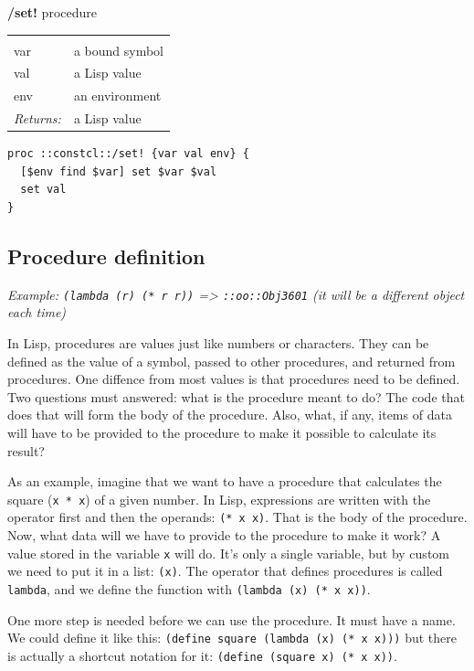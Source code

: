\documentclass[twoside,9pt]{report}
\begin{document}
\textbf{/set!} procedure

\noindent\begin{tabular}{ |p{1.5cm} p{8cm}| }
\hline
\rowcolor[HTML]{CCCCCC} \multicolumn{2}{|l|}{\bf /set! (internal)} \\
var & a bound symbol \\
val & a Lisp value \\
env & an environment \\
\textit{Returns:} & a Lisp value \\
\hline
\end{tabular}
\begin{lstlisting}
proc ::constcl::/set! {var val env} {
  [$env find $var] set $var $val
  set val
}
\end{lstlisting}
\subsection{Procedure definition}
\label{procedure-definition}


\emph{Example: \texttt{(lambda (r) (* r r))} => \texttt{::oo::Obj3601} (it will be a different object each time)}


In Lisp, procedures are values just like numbers or characters. They can be defined as the value of a symbol, passed to other procedures, and returned from procedures. One diffence from most values is that procedures need to be defined. Two questions must answered: what is the procedure meant to do? The code that does that will form the body of the procedure. Also, what, if any, items of data will have to be provided to the procedure to make it possible to calculate its result?


As an example, imagine that we want to have a procedure that calculates the square (\texttt{x * x}) of a given number. In Lisp, expressions are written with the operator first and then the operands: \texttt{(* x x)}. That is the body of the procedure. Now, what data will we have to provide to the procedure to make it work? A value stored in the variable \texttt{x} will do. It's only a single variable, but by custom we need to put it in a list: \texttt{(x)}. The operator that defines procedures is called \texttt{lambda}, and we define the function with \texttt{(lambda (x) (* x x))}.


One more step is needed before we can use the procedure. It must have a name. We could define it like this: \texttt{(define square (lambda (x) (* x x)))} but there is actually a shortcut notation for it: \texttt{(define (square x) (* x x))}.
\end{document}
